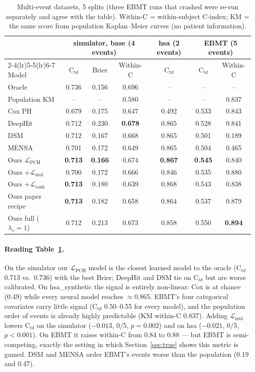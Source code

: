\documentclass[11pt,a4paper]{article}
\newcommand{\best}[1]{\textbf{#1}}
\newcommand{\Lpch}{$\mathcal{L}_{\mathrm{PCH}}$}
\newcommand{\Lrank}{$\mathcal{L}_{\mathrm{rank}}$}
\newcommand{\Lmul}{$\mathcal{L}_{\mathrm{mul}}$}
\newcommand{\Ctd}{C$_{td}$}
\begin{document}
\begin{table}[H]\centering\small
\caption{Multi-event datasets, 5 splits (three EBMT runs that crashed were re-run separately and agree with the table).
Within-C = within-subject C-index; KM = the same score from population Kaplan--Meier curves (no patient information).}
\label{tab:multi}
\begin{tabular}{lcccccc}
\toprule
 & \multicolumn{3}{c}{simulator, base (4 events)} & hsa (2 events) & \multicolumn{2}{c}{EBMT (5 events)} \\
\cmidrule(lr){2-4}\cmidrule(lr){5-5}\cmidrule(lr){6-7}
Model & \Ctd{} & Brier & Within-C & \Ctd{} & \Ctd{} & Within-C \\
\midrule
Oracle & 0.736 & 0.156 & 0.696 & -- & -- & -- \\
Population KM & -- & -- & 0.580 & -- & -- & 0.837 \\
\midrule
Cox PH & 0.679 & 0.175 & 0.647 & 0.492 & 0.533 & 0.843 \\
DeepHit & 0.712 & 0.230 & \best{0.678} & 0.865 & 0.528 & 0.841 \\
DSM & 0.712 & 0.167 & 0.668 & 0.865 & 0.501 & 0.189 \\
MENSA & 0.701 & 0.172 & 0.649 & 0.865 & 0.504 & 0.465 \\
\midrule
Ours \Lpch{} & \best{0.713} & \best{0.166} & 0.674 & \best{0.867} & \best{0.545} & 0.840 \\
Ours $+$\Lmul{} & 0.700 & 0.172 & 0.666 & 0.846 & 0.535 & 0.880 \\
Ours $+$\Lrank{} & \best{0.713} & 0.180 & 0.639 & 0.868 & 0.543 & 0.838 \\
Ours paper recipe & \best{0.713} & 0.182 & 0.658 & 0.864 & 0.537 & 0.879 \\
Ours full ($\lambda_v{=}1$) & 0.712 & 0.213 & 0.673 & 0.858 & 0.550 & \best{0.894} \\
\bottomrule
\end{tabular}
\end{table}

\paragraph{Reading Table~\ref{tab:multi}.} On the simulator our \Lpch{} model is the closest learned model to the
oracle (\Ctd{} 0.713 vs.\ 0.736) with the best Brier; DeepHit and DSM tie on \Ctd{} but are worse calibrated. On
hsa\_synthetic the signal is entirely non-linear: Cox is at chance (0.49) while every neural model reaches
$\approx$0.865. EBMT's four categorical covariates carry little signal (\Ctd{} 0.50--0.55 for every model), and the
population order of events is already highly predictable (KM within-C 0.837). Adding \Lmul{} lowers \Ctd{} on the
simulator ($-0.013$, 0/5, $p=0.002$) and on hsa ($-0.021$, 0/5, $p<0.001$). On EBMT it raises within-C from 0.84 to
0.88 --- but EBMT is semi-competing, exactly the setting in which Section~\ref{sec:true} shows this metric is gamed.
DSM and MENSA order EBMT's events worse than the population (0.19 and 0.47).
\end{document}
